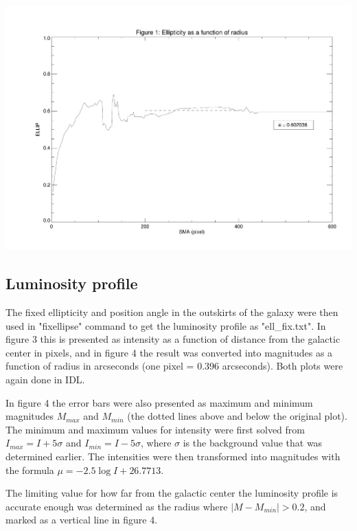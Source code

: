 \documentclass[a4paper,12pt]{article}
\begin{document}
\centerline{\includegraphics[scale=0.6,page=2]{ellipticity.pdf}}%

\subsection{Luminosity profile}

The fixed ellipticity and position angle in the outskirts of the galaxy were then used in "fixellipse" command to get the luminosity profile as "ell\_fix.txt". In figure 3 this is presented as intensity as a function of distance from the galactic center in pixels, and in figure 4 the result was converted into magnitudes as a function of radius in arcseconds (one pixel = 0.396 arcseconds). Both plots were again done in IDL.

In figure 4 the error bars were also presented as maximum and minimum magnitudes $M_{max}$ and $M_{min}$ (the dotted lines above and below the original plot). The minimum and maximum values for intensity were first solved from $I_{max}=I+5\sigma$ and $I_{min}=I-5\sigma$, where $\sigma$ is the background value that was determined earlier. The intensities were then transformed into magnitudes with the formula $\mu = -2.5 \log I+26.7713$.

The limiting value for how far from the galactic center the luminosity profile is accurate enough was determined as the radius where $|M-M_{min}|>0.2$, and marked as a vertical line in figure 4.

\end{document}
